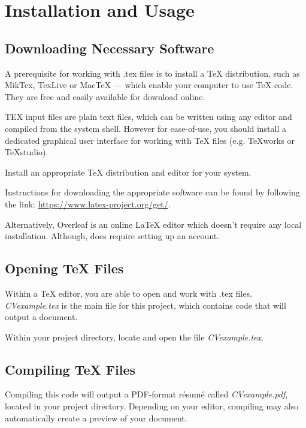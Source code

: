 \section{Installation and Usage}

\subsection{Downloading Necessary Software}
A prerequisite for working with .tex files is to install a TeX distribution, such as MikTex, TexLive or MacTeX --- which enable your computer to use TeX code. They are free and easily available for download online. \par

TEX input files are plain text files, which can be written using any editor and compiled from the system shell. However for ease-of-use, you should install a dedicated graphical user interface for working with TeX files (e.g. TeXworks or TeXstudio). \par

\begin{instrct}
Install an appropriate TeX distribution and editor for your system. \par
\end{instrct}

Instructions for downloading the appropriate software can be found by following the link: \url{https://www.latex-project.org/get/}. \par

Alternatively, Overleaf is an online LaTeX editor which doesn't require any local installation. Although, does require setting up an account. \par

\subsection{Opening TeX Files}
Within a TeX editor, you are able to open and work with .tex files. \emph{CVexample.tex} is the main file for this project, which contains code that will output a document.

\begin{instrct}
Within your project directory, locate and open the file \emph{CVexample.tex}.
\end{instrct}

\subsection{Compiling TeX Files}
Compiling this code will output a PDF-format r\'esum\'e called \emph{CVexample.pdf}, located in your project directory. Depending on your editor, compiling may also automatically create a preview of your document. \par

